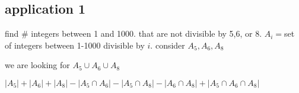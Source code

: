 \documentclass{article}
\begin{document}
\subsection*{application 1}
find \# integers between 1 and 1000. that are not divisible by 5,6, or 8.
$A_i=$set of integers between 1-1000 divisible by $i$. consider $A_5,A_6,A_8$

we are looking for $A_5\cup A_6\cup A_8$

$\left\lvert A_5\right\rvert+\left\lvert A_6\right\rvert+\left\lvert A_8\right\rvert-\left\lvert A_5\cap A_6\right\rvert-\left\lvert A_5\cap A_8\right\rvert-\left\lvert A_6\cap A_8\right\rvert+\left\lvert A_5\cap A_6\cap A_8\right\rvert$
\end{document}
